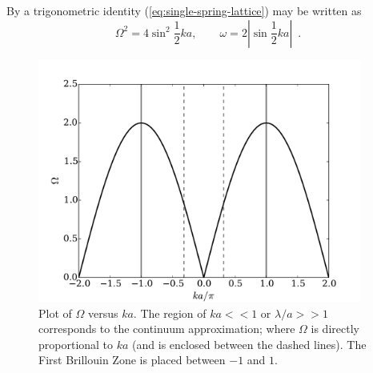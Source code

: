 \documentclass[12pt,letterpaper]{article}
\begin{document}
By a trigonometric identity (\ref{eq:single-spring-lattice}) may be written as
\begin{equation}
\Omega^2 = 4 \sin^2 \frac{1}{2}ka, \qquad \omega = 2\left\vert \sin \frac{1}{2} ka\right\vert \enspace .
\end{equation}

\begin{figure}[h]
\centering
\includegraphics[height=8cm]{img/spring-mass-plot.pdf} 
\caption{Plot of $\Omega$ versus $ka$. The region of $ka<<1$ or $\lambda/a>>1$ corresponds to the continuum approximation; where $\Omega$ is directly proportional to $ka$ (and is enclosed between the dashed lines). The First Brillouin Zone is placed between $-1$ and $1$.}
\label{fig:spring-mass-dispersion}
\end{figure}
\end{document}
